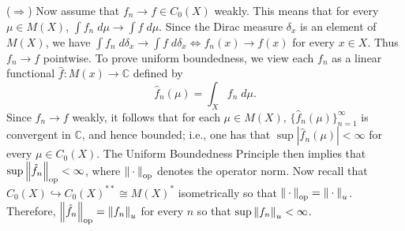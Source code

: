 \documentclass{article}
\begin{document}
	($\Longrightarrow$) Now assume that $f_{n} \to f \in C_{0}(X)$ weakly. This means that for every $\mu \in M(X)$, $\int f_{n}\;d\mu\to \int f\;d\mu$. Since the Dirac measure $\delta_{x}$ is an element of $M(X)$, we have $\int f_{n}\;d\delta_{x} \to \int f\;d\delta_{x} \iff f_{n}(x) \to f(x)$ for every $x \in X$. Thus $f_{n} \to f$ pointwise. To prove uniform boundedness, we view each $f_{n}$ as a linear functional $\hat{f}: M(x) \to \mathbb{C}$ defined by 
	\begin{equation*}
		\hat{f}_{n}(\mu) = \int_{X}f_{n}\;d\mu. 
	\end{equation*}
	Since $f_{n} \to f$ weakly, it follows that for each $\mu \in M(X)$, $\{\hat{f}_{n}(\mu)\}_{n = 1}^{\infty}$ is convergent in $\mathbb{C}$, and hence bounded; i.e., one has that $\sup |\hat{f}_{n}(\mu)|< \infty$ for every $\mu \in C_{0}(X)$. The Uniform Boundedness Principle then implies that $\sup \left\Vert \hat{f}_{n} \right\Vert_{\text{op}}< \infty$, where $\left\Vert \hspace{2pt}\cdot\hspace{2pt} \right\Vert_{\text{op}}$ denotes the operator norm. Now recall that $C_{0}(X) \hookrightarrow C_{0}(X)^{\ast\ast} \cong M(X)^{\ast}$ isometrically so that $\left\Vert \hspace{2pt}\cdot\hspace{2pt} \right\Vert_{\text{op}} = \left\Vert \hspace{2pt}\cdot\hspace{2pt} \right\Vert_{u}$. Therefore, $\left\Vert \hat{f}_{n} \right\Vert_{\text{op}} = \left\Vert f_{n} \right\Vert_{u}$ for every $n$ so that $\sup\left\Vert f_{n} \right\Vert_{u} < \infty$. 
	
\end{document}
